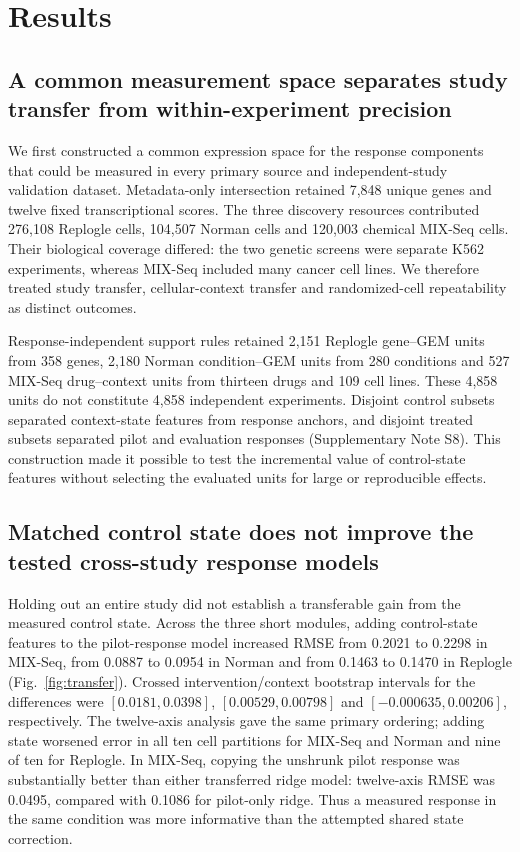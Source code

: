 \documentclass[a4paper,fleqn]{cas-sc}
\makeatletter
\DeclareRobustCommand{\rev}[1]{{\color{red}\def\@citecolor{black}\def\@linkcolor{red}\def\@urlcolor{red}#1}}
\makeatother
\begin{document}
\section{Results}

\subsection{\rev{A common measurement space separates study transfer from within-experiment precision}}

\rev{We first constructed a common expression space for the response components that could be measured in every primary source and independent-study validation dataset.} \rev{Metadata-only intersection retained 7,848 unique genes and twelve fixed transcriptional scores.} \rev{The three discovery resources contributed 276,108 Replogle cells, 104,507 Norman cells and 120,003 chemical MIX-Seq cells.} \rev{Their biological coverage differed: the two genetic screens were separate K562 experiments, whereas MIX-Seq included many cancer cell lines.} \rev{We therefore treated study transfer, cellular-context transfer and randomized-cell repeatability as distinct outcomes.}

\rev{Response-independent support rules retained 2,151 Replogle gene--GEM units from 358 genes, 2,180 Norman condition--GEM units from 280 conditions and 527 MIX-Seq drug--context units from thirteen drugs and 109 cell lines.} \rev{These 4,858 units do not constitute 4,858 independent experiments.} \rev{Disjoint control subsets separated context-state features from response anchors, and disjoint treated subsets separated pilot and evaluation responses (Supplementary Note S8).} \rev{This construction made it possible to test the incremental value of control-state features without selecting the evaluated units for large or reproducible effects.}

\subsection{\rev{Matched control state does not improve the tested cross-study response models}}

\rev{Holding out an entire study did not establish a transferable gain from the measured control state.} \rev{Across the three short modules, adding control-state features to the pilot-response model increased RMSE from 0.2021 to 0.2298 in MIX-Seq, from 0.0887 to 0.0954 in Norman and from 0.1463 to 0.1470 in Replogle (Fig.~\ref{fig:transfer}).} \rev{Crossed intervention/context bootstrap intervals for the differences were $[0.0181,0.0398]$, $[0.00529,0.00798]$ and $[-0.000635,0.00206]$, respectively.} \rev{The twelve-axis analysis gave the same primary ordering; adding state worsened error in all ten cell partitions for MIX-Seq and Norman and nine of ten for Replogle.} \rev{In MIX-Seq, copying the unshrunk pilot response was substantially better than either transferred ridge model: twelve-axis RMSE was 0.0495, compared with 0.1086 for pilot-only ridge.} \rev{Thus a measured response in the same condition was more informative than the attempted shared state correction.}
\end{document}
